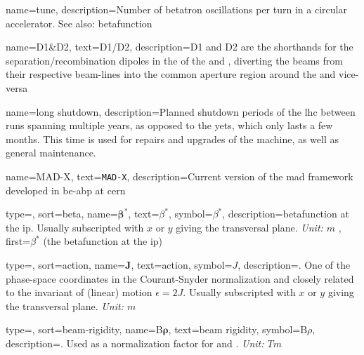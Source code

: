 {
        name=tune,
        description={Number of betatron oscillations per turn in a circular accelerator.
        See also: \gls{betafunction}%
        }
}

{
        name={D1\&D2},
        text={D1/D2},
        description={D1 and D2 are the shorthands for the separation/recombination dipoles in the 
         of the  and , diverting the \glspl{beam} from their respective
        beam-lines into the common aperture region around the  and 
        vice-versa%
        }
}

{
        name={long shutdown},
        description={Planned shutdown periods of the \acrfull{lhc} between \glspl{run} spanning multiple years,
        as opposed to the \acrfull{yets}, which only lasts a few months.
        This time is used for repairs and upgrades of the machine, as well as general maintenance.
        }
}

{
        name={MAD-X},
        text={\texttt{MAD-X}},
        description={Current version of the \acrfull{mad} framework developed in \acrshort{be}-\acrshort{abp}
        at \acrshort{cern}%
        }
}



{
    type=\symboltype,
    sort={beta},
    name={$\bm \beta^*$},
    text={\ensuremath{\beta^*}},
    symbol={\ensuremath{\beta^*}},
    description={\gls{betafunction} at the \acrshort{ip}. 
    Usually subscripted with $x$ or $y$ giving the transversal plane.
    \textit{Unit: $m$}%
    },
    first={$\beta^*$ (the \gls{betafunction} at the \acrshort{ip})}
}

{
    type=\symboltype,
    sort={action},
    name={$\bm J$},
    text={action},
    symbol={\ensuremath{J}},
    description={.
    One of the phase-space coordinates in the Courant-Snyder normalization
    and closely related to the invariant of (linear) motion $\epsilon = 2J$. 
    Usually subscripted with $x$ or $y$ giving the transversal plane.
    \textit{Unit: $m$}%
    }
}

{
    type=\symboltype,
    sort={beam-rigidity},
    name={B$\bm \rho$},
    text={beam rigidity},
    symbol={\ensuremath{\mathrm{B}\rho}},
    description={.
    Used as a normalization factor for  and . 
    \textit{Unit: $Tm$}%
    }
}

